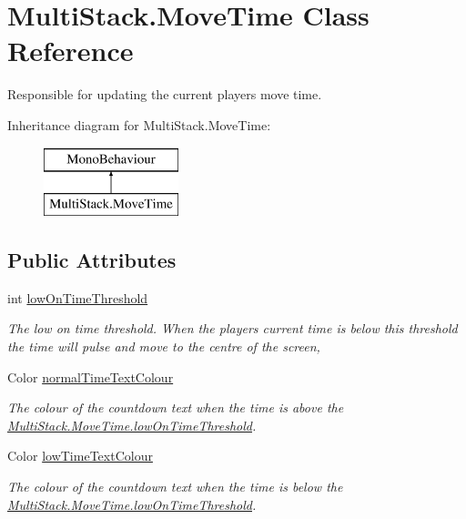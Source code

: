 \hypertarget{class_multi_stack_1_1_move_time}{}\section{Multi\+Stack.\+Move\+Time Class Reference}
\label{class_multi_stack_1_1_move_time}


Responsible for updating the current players move time.  


Inheritance diagram for Multi\+Stack.\+Move\+Time\+:\begin{figure}[H]
\begin{center}
\leavevmode
\includegraphics[height=2.000000cm]{class_multi_stack_1_1_move_time}
\end{center}
\end{figure}
\subsection*{Public Attributes}
\begin{DoxyCompactItemize}
\item 
int \hyperlink{class_multi_stack_1_1_move_time_a1f9dcd4f0bb8bd038f486c5a0ac2478e}{low\+On\+Time\+Threshold}
\begin{DoxyCompactList}\small\item\em The low on time threshold. When the players current time is below this threshold the time will pulse and move to the centre of the screen, \end{DoxyCompactList}\item 
Color \hyperlink{class_multi_stack_1_1_move_time_a31e3512da14ba52898e306c4d8b63320}{normal\+Time\+Text\+Colour}
\begin{DoxyCompactList}\small\item\em The colour of the countdown text when the time is above the \hyperlink{class_multi_stack_1_1_move_time_a1f9dcd4f0bb8bd038f486c5a0ac2478e}{Multi\+Stack.\+Move\+Time.\+low\+On\+Time\+Threshold}. \end{DoxyCompactList}\item 
Color \hyperlink{class_multi_stack_1_1_move_time_a4de86ca47dc6be9e38117ee65a1677e6}{low\+Time\+Text\+Colour}
\begin{DoxyCompactList}\small\item\em The colour of the countdown text when the time is below the \hyperlink{class_multi_stack_1_1_move_time_a1f9dcd4f0bb8bd038f486c5a0ac2478e}{Multi\+Stack.\+Move\+Time.\+low\+On\+Time\+Threshold}. \end{DoxyCompactList}\end{DoxyCompactItemize}


